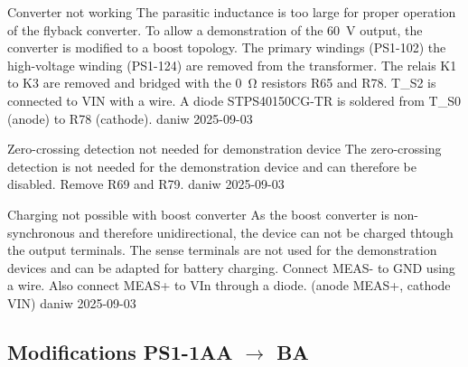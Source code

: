 \begin{ModTable}

\ModItemDone
{Converter not working}
{The parasitic inductance is too large for proper operation of the flyback converter. To allow a demonstration of the \qty{60}{\volt} output, the converter is modified to a boost topology. }
{The primary windings (PS1-102) the high-voltage winding (PS1-124) are removed from the transformer. The relais K1 to K3 are removed and bridged with the \qty{0}{\ohm} resistors R65 and R78. T\_S2 is connected to VIN with a wire. A diode STPS40150CG-TR is soldered from T\_S0 (anode) to R78 (cathode). }
{daniw}
{2025-09-03}

\ModItemDone
{Zero-crossing detection not needed for demonstration device}
{The zero-crossing detection is not needed for the demonstration device and can therefore be disabled. }
{Remove R69 and R79. }
{daniw}
{2025-09-03}

\ModItemDone
{Charging not possible with boost converter}
{As the boost converter is non-synchronous and therefore unidirectional, the device can not be charged thtough the output terminals. The sense terminals are not used for the demonstration devices and can be adapted for battery charging. }
{Connect MEAS- to GND using a wire. Also connect MEAS+ to VIn through a diode. (anode MEAS+, cathode VIN)}
{daniw}
{2025-09-03}

\end{ModTable}

\FloatBarrier

\subsection{Modifications PS1-1AA $\to$ BA}

